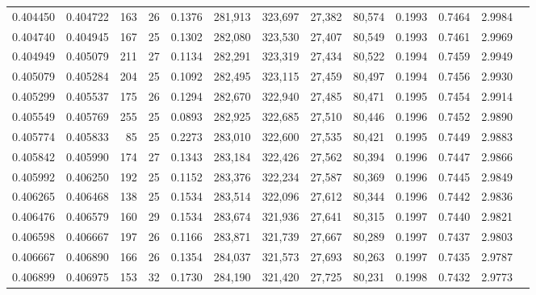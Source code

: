 \begin{tabular}{rrrrrrrrrrrrr}
0.404450 & 0.404722 &    163 &    26 &                                     0.1376 & 281,913 & 323,697 &  27,382 &  80,574 & 0.1993 & 0.7464 & 2.9984 \\
0.404740 & 0.404945 &    167 &    25 &                                     0.1302 & 282,080 & 323,530 &  27,407 &  80,549 & 0.1993 & 0.7461 & 2.9969 \\
0.404949 & 0.405079 &    211 &    27 &                                     0.1134 & 282,291 & 323,319 &  27,434 &  80,522 & 0.1994 & 0.7459 & 2.9949 \\
0.405079 & 0.405284 &    204 &    25 &                                     0.1092 & 282,495 & 323,115 &  27,459 &  80,497 & 0.1994 & 0.7456 & 2.9930 \\
0.405299 & 0.405537 &    175 &    26 &                                     0.1294 & 282,670 & 322,940 &  27,485 &  80,471 & 0.1995 & 0.7454 & 2.9914 \\
0.405549 & 0.405769 &    255 &    25 &                                     0.0893 & 282,925 & 322,685 &  27,510 &  80,446 & 0.1996 & 0.7452 & 2.9890 \\
0.405774 & 0.405833 &     85 &    25 &                                     0.2273 & 283,010 & 322,600 &  27,535 &  80,421 & 0.1995 & 0.7449 & 2.9883 \\
0.405842 & 0.405990 &    174 &    27 &                                     0.1343 & 283,184 & 322,426 &  27,562 &  80,394 & 0.1996 & 0.7447 & 2.9866 \\
0.405992 & 0.406250 &    192 &    25 &                                     0.1152 & 283,376 & 322,234 &  27,587 &  80,369 & 0.1996 & 0.7445 & 2.9849 \\
0.406265 & 0.406468 &    138 &    25 &                                     0.1534 & 283,514 & 322,096 &  27,612 &  80,344 & 0.1996 & 0.7442 & 2.9836 \\
0.406476 & 0.406579 &    160 &    29 &                                     0.1534 & 283,674 & 321,936 &  27,641 &  80,315 & 0.1997 & 0.7440 & 2.9821 \\
0.406598 & 0.406667 &    197 &    26 &                                     0.1166 & 283,871 & 321,739 &  27,667 &  80,289 & 0.1997 & 0.7437 & 2.9803 \\
0.406667 & 0.406890 &    166 &    26 &                                     0.1354 & 284,037 & 321,573 &  27,693 &  80,263 & 0.1997 & 0.7435 & 2.9787 \\
0.406899 & 0.406975 &    153 &    32 &                                     0.1730 & 284,190 & 321,420 &  27,725 &  80,231 & 0.1998 & 0.7432 & 2.9773 \\

\end{tabular}
